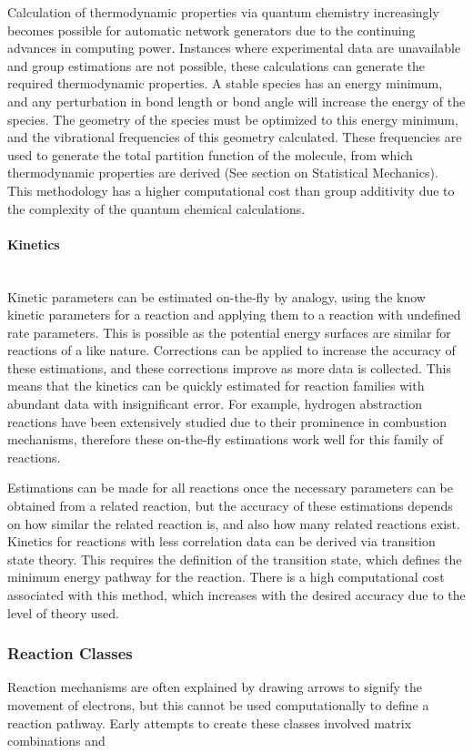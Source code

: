 \documentclass[12pt]{article}
\begin{document}
Calculation of thermodynamic properties via quantum chemistry increasingly becomes possible for automatic network generators due to the continuing advances in computing power. Instances where experimental data are unavailable and group estimations are not possible, these calculations can generate the required thermodynamic properties. A stable species has an energy minimum, and any perturbation in bond length or bond angle will increase the energy of the species. The geometry of the species must be optimized to this energy minimum, and the vibrational frequencies of this geometry calculated. These frequencies are used to generate the total partition function of the molecule, from which thermodynamic properties are derived (See section on Statistical Mechanics). This methodology has a higher computational cost than group additivity due to the complexity of the quantum chemical calculations.

\paragraph{Kinetics}\mbox{}\\
Kinetic parameters can be estimated on-the-fly by analogy, using the know kinetic parameters for a reaction and applying them to a reaction with undefined rate parameters. This is possible as the potential energy surfaces are similar for reactions of a like nature. Corrections can be applied to increase the accuracy of these estimations, and these corrections improve as more data is collected. This means that the kinetics can be quickly estimated for reaction families with abundant data with insignificant error. For example, hydrogen abstraction reactions have been extensively studied due to their prominence in combustion mechanisms, therefore these on-the-fly estimations work well for this family of reactions.

Estimations can be made for all reactions once the necessary parameters can be obtained from a related reaction, but the accuracy of these estimations depends on how similar the related reaction is, and also how many related reactions exist. Kinetics for reactions with less correlation data can be derived via transition state theory. This requires the definition of the transition state, which defines the minimum energy pathway for the reaction. There is a high computational cost associated with this method, which increases with the desired accuracy due to the level of theory used.

\subsubsection{Reaction Classes}
Reaction mechanisms are often explained by drawing arrows to signify the movement of electrons, but this cannot be used computationally to define a reaction pathway. Early attempts to create these classes involved matrix combinations and 
\end{document}
